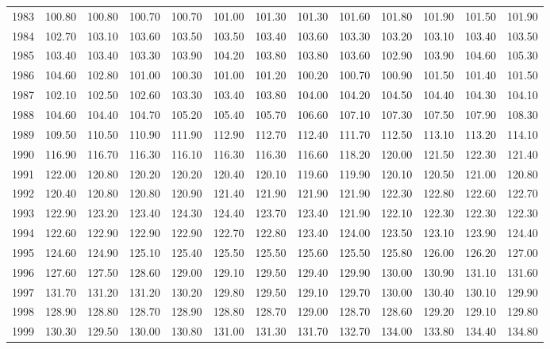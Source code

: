\begin{longtable}{rrrrrrrrrrrrr}
  1983 & 100.80 & 100.80 & 100.70 & 100.70 & 101.00 & 101.30 & 101.30 & 101.60 & 101.80 & 101.90 & 101.50 & 101.90 \\ 
  1984 & 102.70 & 103.10 & 103.60 & 103.50 & 103.50 & 103.40 & 103.60 & 103.30 & 103.20 & 103.10 & 103.40 & 103.50 \\ 
  1985 & 103.40 & 103.40 & 103.30 & 103.90 & 104.20 & 103.80 & 103.80 & 103.60 & 102.90 & 103.90 & 104.60 & 105.30 \\ 
  1986 & 104.60 & 102.80 & 101.00 & 100.30 & 101.00 & 101.20 & 100.20 & 100.70 & 100.90 & 101.50 & 101.40 & 101.50 \\ 
  1987 & 102.10 & 102.50 & 102.60 & 103.30 & 103.40 & 103.80 & 104.00 & 104.20 & 104.50 & 104.40 & 104.30 & 104.10 \\ 
  1988 & 104.60 & 104.40 & 104.70 & 105.20 & 105.40 & 105.70 & 106.60 & 107.10 & 107.30 & 107.50 & 107.90 & 108.30 \\ 
  1989 & 109.50 & 110.50 & 110.90 & 111.90 & 112.90 & 112.70 & 112.40 & 111.70 & 112.50 & 113.10 & 113.20 & 114.10 \\ 
  1990 & 116.90 & 116.70 & 116.30 & 116.10 & 116.30 & 116.30 & 116.60 & 118.20 & 120.00 & 121.50 & 122.30 & 121.40 \\ 
  1991 & 122.00 & 120.80 & 120.20 & 120.20 & 120.40 & 120.10 & 119.60 & 119.90 & 120.10 & 120.50 & 121.00 & 120.80 \\ 
  1992 & 120.40 & 120.80 & 120.80 & 120.90 & 121.40 & 121.90 & 121.90 & 121.90 & 122.30 & 122.80 & 122.60 & 122.70 \\ 
  1993 & 122.90 & 123.20 & 123.40 & 124.30 & 124.40 & 123.70 & 123.40 & 121.90 & 122.10 & 122.30 & 122.30 & 122.30 \\ 
  1994 & 122.60 & 122.90 & 122.90 & 122.90 & 122.70 & 122.80 & 123.40 & 124.00 & 123.50 & 123.10 & 123.90 & 124.40 \\ 
  1995 & 124.60 & 124.90 & 125.10 & 125.40 & 125.50 & 125.50 & 125.60 & 125.50 & 125.80 & 126.00 & 126.20 & 127.00 \\ 
  1996 & 127.60 & 127.50 & 128.60 & 129.00 & 129.10 & 129.50 & 129.40 & 129.90 & 130.00 & 130.90 & 131.10 & 131.60 \\ 
  1997 & 131.70 & 131.20 & 131.20 & 130.20 & 129.80 & 129.50 & 129.10 & 129.70 & 130.00 & 130.40 & 130.10 & 129.90 \\ 
  1998 & 128.90 & 128.80 & 128.70 & 128.90 & 128.80 & 128.70 & 129.00 & 128.70 & 128.60 & 129.20 & 129.10 & 129.80 \\ 
  1999 & 130.30 & 129.50 & 130.00 & 130.80 & 131.00 & 131.30 & 131.70 & 132.70 & 134.00 & 133.80 & 134.40 & 134.80 \\ 

\end{longtable}
